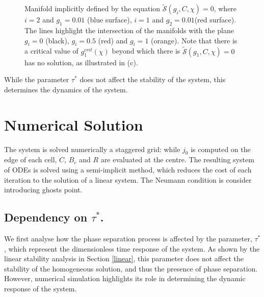 \documentclass[12pt]{extarticle}
\begin{document}
\begin{figure}[h!]
\begin{subfigure}{0.53\textwidth}
		\caption{}
	\end{subfigure}
	\begin{subfigure}{1\textwidth}
		\centering
	\def\svgwidth{0.72\linewidth}
	
	\caption{}
	\end{subfigure}
\caption{Manifold implicitly defined by the equation $\tilde{\mathcal{S}}(g_i,C,\chi)=0$, where $i=2$ and $g_1=0.01$ (blue surface), $i=1$ and $g_2=0.01$(red surface). The lines highlight the intersection of the manifolds with the plane $g_i=0$ (black), $g_i=0.5$ (red) and $g_i=1$ (orange). Note that there is a critical value of $g^{crit}_1(\chi)$ beyond which there is $\tilde{\mathcal{S}}(g_1,C,\chi)=0$ has no solution, as illustrated in (c).}
\end{figure}

While the parameter $\tau^*$ does not affect the stability of the system, this determines the dynamics of the system. 

\newpage
\section{Numerical Solution}

The system is solved numerically a staggered grid: while $j_0$ is computed on the edge of each cell, $C$, $B_e$ and $R$ are evaluated at the centre. The resulting system of ODEs is solved using a semi-implicit method, which reduces the cost of each iteration to the solution of a linear system. The Neumann condition is consider introducing ghosts point. 

\subsection{Dependency on $\tau^*$.}
We first analyse how the phase separation process is affected by the parameter, $\tau^*$, which represent the dimensionless time response of the system. As shown by the linear stability analysis in Section \ref{linear}, this parameter does not affect the stability of the homogeneous solution, and thus the presence of phase separation. However, numerical simulation highlights its role in determining the dynamic response of the system. 
\end{document}
